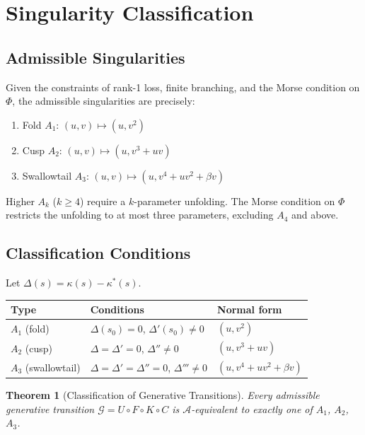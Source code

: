 \documentclass[12pt, oneside]{book}
\theoremstyle{plain}
\newtheorem{theorem}{Theorem}[section]
\theoremstyle{definition}
\theoremstyle{remark}
\begin{document}
\section{Singularity Classification}

\subsection{Admissible Singularities}

Given the constraints of rank-1 loss, finite branching, and the Morse
condition on $\Phi$, the admissible singularities are precisely:

\begin{enumerate}
\item Fold $A_1$: $(u,v) \mapsto (u, v^2)$
\item Cusp $A_2$: $(u,v) \mapsto (u, v^3 + uv)$
\item Swallowtail $A_3$: $(u,v) \mapsto (u, v^4 + uv^2 + \beta v)$
\end{enumerate}

Higher $A_k$ ($k \ge 4$) require a $k$-parameter unfolding. The Morse
condition on $\Phi$ restricts the unfolding to at most three
parameters, excluding $A_4$ and above.

\subsection{Classification Conditions}

Let $\Delta(s) = \kappa(s) - \kappa^*(s)$.

\begin{center}
\begin{tabular}{lll}
\toprule
Type & Conditions & Normal form \\
\midrule
$A_1$ (fold) & $\Delta(s_0)=0$, $\Delta'(s_0)\ne 0$ & $(u,v^2)$ \\
$A_2$ (cusp) & $\Delta=\Delta'=0$, $\Delta''\ne 0$ & $(u,v^3+uv)$ \\
$A_3$ (swallowtail) & $\Delta=\Delta'=\Delta''=0$, $\Delta'''\ne 0$
  & $(u,v^4+uv^2+\beta v)$ \\
\bottomrule
\end{tabular}
\end{center}

\begin{theorem}[Classification of Generative Transitions]
Every admissible generative transition $\mathcal{G} = U \circ F \circ
K \circ C$ is $\mathcal{A}$-equivalent to exactly one of $A_1$,
$A_2$, $A_3$.
\end{theorem}
\end{document}
